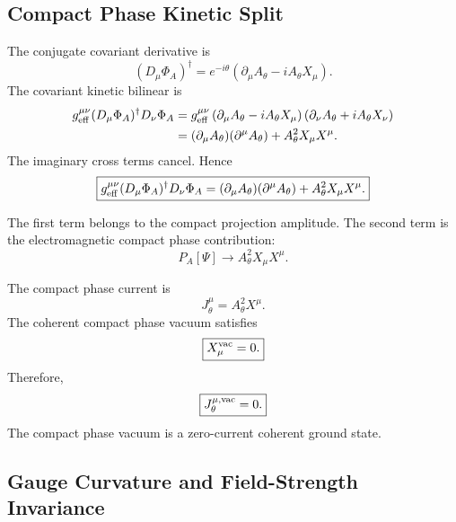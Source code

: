 \documentclass[11pt]{article}
\begin{document}
\subsection{Compact Phase Kinetic Split}

The conjugate covariant derivative is
\begin{equation}
\boxed{
(D_\mu\Phi_A)^\dagger
=
e^{-i\theta}
\left(
\partial_\mu A_\theta-iA_\theta X_\mu
\right).
}
\end{equation}
The covariant kinetic bilinear is
\begin{align}
g_{\rm eff}^{\mu\nu}
(D_\mu\Phi_A)^\dagger D_\nu\Phi_A
&=
g_{\rm eff}^{\mu\nu}
\left(
\partial_\mu A_\theta-iA_\theta X_\mu
\right)
\left(
\partial_\nu A_\theta+iA_\theta X_\nu
\right)
\\
&=
(\partial_\mu A_\theta)(\partial^\mu A_\theta)
+
A_\theta^2X_\mu X^\mu.
\end{align}
The imaginary cross terms cancel. Hence
\begin{equation}
\boxed{
g_{\rm eff}^{\mu\nu}
(D_\mu\Phi_A)^\dagger D_\nu\Phi_A
=
(\partial_\mu A_\theta)(\partial^\mu A_\theta)
+
A_\theta^2X_\mu X^\mu.
}
\end{equation}

The first term belongs to the compact projection amplitude. The second term is
the electromagnetic compact phase contribution:
\begin{equation}
\boxed{
P_A[\Psi]
\rightarrow
A_\theta^2X_\mu X^\mu.
}
\end{equation}

The compact phase current is
\begin{equation}
\boxed{
J_\theta^\mu
=
A_\theta^2X^\mu.
}
\end{equation}
The coherent compact phase vacuum satisfies
\begin{equation}
\boxed{
X_\mu^{\rm vac}=0.
}
\end{equation}
Therefore,
\begin{equation}
\boxed{
J_\theta^{\mu,{\rm vac}}=0.
}
\end{equation}
The compact phase vacuum is a zero-current coherent ground state.

\subsection{Gauge Curvature and Field-Strength Invariance}
\end{document}
